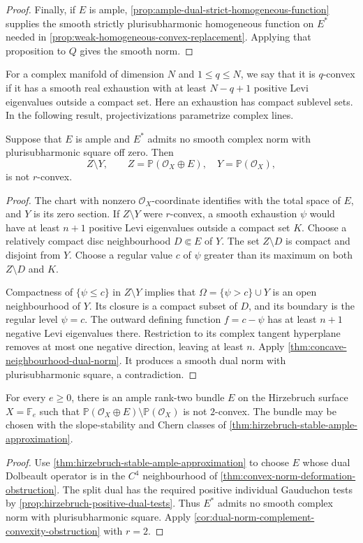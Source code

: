\begin{proof}
Finally, if $E$ is ample, \cref{prop:ample-dual-strict-homogeneous-function} supplies the smooth strictly plurisubharmonic homogeneous function on $E^*$ needed in \cref{prop:weak-homogeneous-convex-replacement}. Applying that proposition to $Q$ gives the smooth norm.
\end{proof}

For a complex manifold of dimension $N$ and $1\leq q\leq N$, we say that it is $q$-convex if it has a smooth real exhaustion with at least $N-q+1$ positive Levi eigenvalues outside a compact set. Here an exhaustion has compact sublevel sets. In the following result, projectivizations parametrize complex lines.

\begin{corollary}\label{cor:dual-norm-complement-convexity-obstruction}
Suppose that $E$ is ample and $E^*$ admits no smooth complex norm with plurisubharmonic square off zero. Then
\[
 Z\setminus Y,\qquad Z=\mathbb P(\mathcal O_X\oplus E),
 \quad Y=\mathbb P(\mathcal O_X),
\]
is not $r$-convex.
\end{corollary}
\begin{proof}
The chart with nonzero $\mathcal O_X$-coordinate identifies with the total space of $E$, and $Y$ is its zero section. If $Z\setminus Y$ were $r$-convex, a smooth exhaustion $\psi$ would have at least $n+1$ positive Levi eigenvalues outside a compact set $K$. Choose a relatively compact disc neighbourhood $D\Subset E$ of $Y$. The set $Z\setminus D$ is compact and disjoint from $Y$. Choose a regular value $c$ of $\psi$ greater than its maximum on both $Z\setminus D$ and $K$.

Compactness of $\{\psi\leq c\}$ in $Z\setminus Y$ implies that $\Omega=\{\psi>c\}\cup Y$ is an open neighbourhood of $Y$. Its closure is a compact subset of $D$, and its boundary is the regular level $\psi=c$. The outward defining function $f=c-\psi$ has at least $n+1$ negative Levi eigenvalues there. Restriction to its complex tangent hyperplane removes at most one negative direction, leaving at least $n$. Apply \cref{thm:concave-neighbourhood-dual-norm}. It produces a smooth dual norm with plurisubharmonic square, a contradiction.
\end{proof}

\begin{corollary}\label{cor:hirzebruch-non-two-convex-complement}
For every $e\geq0$, there is an ample rank-two bundle $E$ on the Hirzebruch surface $X=\mathbb F_e$ such that $\mathbb P(\mathcal O_X\oplus E)\setminus\mathbb P(\mathcal O_X)$ is not $2$-convex. The bundle may be chosen with the slope-stability and Chern classes of \cref{thm:hirzebruch-stable-ample-approximation}.
\end{corollary}
\begin{proof}
Use \cref{thm:hirzebruch-stable-ample-approximation} to choose $E$ whose dual Dolbeault operator is in the $C^4$ neighbourhood of \cref{thm:convex-norm-deformation-obstruction}. The split dual has the required positive individual Gauduchon tests by \cref{prop:hirzebruch-positive-dual-tests}. Thus $E^*$ admits no smooth complex norm with plurisubharmonic square. Apply \cref{cor:dual-norm-complement-convexity-obstruction} with $r=2$.
\end{proof}
